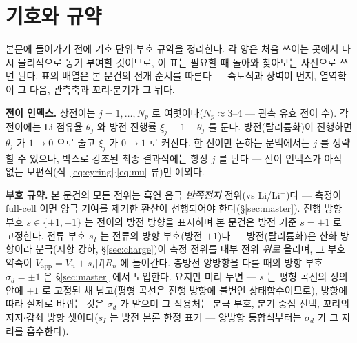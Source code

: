 \documentclass[11pt,a4paper]{article}
\newcommand{\app}{\mathrm{app}}
\begin{document}
\tableofcontents
\newpage

\section{기호와 규약}\label{sec:notation}
본문에 들어가기 전에 기호$\cdot$단위$\cdot$부호 규약을 정리한다. 각 양은 처음 쓰이는 곳에서 다시 물리적으로
동기 부여할 것이므로, 이 표는 필요할 때 돌아와 찾아보는 사전으로 쓰면 된다. 표의 배열은 본 문건의 전개
순서를 따른다 — 속도식과 장벽이 먼저, 열역학이 그 다음, 관측축과 꼬리$\cdot$분기가 그 뒤다.

\textbf{전이 인덱스.} 상전이는 $j=1,\dots,N_p$ 로 여럿이다($N_p\approx3\text{--}4$ — 관측 유효 전이 수). 각
전이에는 Li 점유율 $\theta_j$ 와 방전 진행률 $\xi_j\equiv1-\theta_j$ 를 둔다. 방전(탈리튬화)이 진행하면
$\theta_j$ 가 $1\to0$ 으로 줄고 $\xi_j$ 가 $0\to1$ 로 커진다. 한 전이만 논하는 문맥에서는 $j$ 를 생략할 수
있으나, 박스로 강조된 최종 결과식에는 항상 $j$ 를 단다 — 전이 인덱스가 아직 없는
보편식(식~\eqref{eq:eyring}$\cdot$\eqref{eq:mu} 류)만 예외다.

\textbf{부호 규약.} 본 문건의 모든 전위는 흑연 음극 \emph{반쪽전지} 전위(vs Li/Li$^+$)다 — 측정이
full-cell 이면 양극 기여를 제거한 환산이 선행되어야 한다(\S\ref{sec:master}). 진행 방향 부호
$s\in\{+1,-1\}$ 는 전이의 방전 방향을 표시하며 본 문건은 방전 기준 $s=+1$ 로 고정한다. 전류 부호
$s_I$ 는 전류의 방향 부호(방전 $+1$)다 — 방전(탈리튬화)은 산화 방향이라 분극(저항 강하,
\S\ref{sec:charge})이 측정 전위를 내부 전위 \emph{위로} 올리며, 그 부호 약속이
$V_\app=V_n+s_I|I|R_n$ 에 들어간다. 충방전 양방향을 다룰 때의 방향 부호 $\sigma_d=\pm1$ 은 \S\ref{sec:master} 에서 도입한다.
요지만 미리 두면 — $s$ 는 평형 곡선의 정의 안에 $+1$ 로 고정된 채 남고(평형 곡선은 진행 방향에 불변인
상태함수이므로), 방향에 따라 실제로 바뀌는 것은 $\sigma_d$ 가 맡으며 그 작용처는 분극 부호, 분기 중심 선택,
꼬리의 지지$\cdot$감쇠 방향 셋이다($s_I$ 는 방전 본론 한정 표기 — 양방향 통합식부터는 $\sigma_d$ 가
그 자리를 흡수한다).
\end{document}
